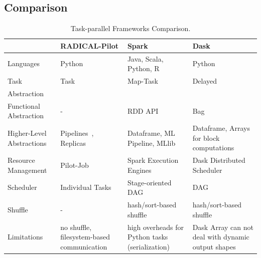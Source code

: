 
\subsection{Comparison}
\begin{table}[t]
    \scriptsize
    \centering
    \begin{tabular}{@{}p{2.75cm}|p{3.25cm}p{3.25cm}p{3.25cm}@{}}
        \toprule
        &\textbf{RADICAL-Pilot} &
        \textbf{Spark} &
        \textbf{Dask} \\
        \midrule
        Languages &
        Python &
        Java, Scala, Python, R &
        Python\\
        Task &
        Task &
        Map-Task &
        Delayed\\
        Abstraction &
        &
        & \\
        Functional Abstraction  &
        - &
        RDD API &
        Bag\\
        Higher-Level Abstractions &
        Pipelines~\cite{balasubramanian2018harnessing}, Replicas~\cite{dakka2018concurrent} &
        Dataframe, ML Pipeline, MLlib~\cite{meng2016mllib} &
        Dataframe, Arrays for block computations\\
        Resource Management &
        Pilot-Job &
        Spark Execution Engines &
        Dask Distributed Scheduler\\
        Scheduler    &
        Individual Tasks &
        Stage-oriented DAG &
        DAG\\
        Shuffle      &
        -       &
        hash/sort-based shuffle &
        hash/sort-based shuffle\\
        Limitations &
        no shuffle, filesystem-based communication  &
        high overheads for Python tasks (serialization)   &
        Dask Array can not deal with dynamic output shapes\\
        \bottomrule
    \end{tabular}
    \caption{Task-parallel Frameworks Comparison.\label{tab:frameworks}}
\end{table}

